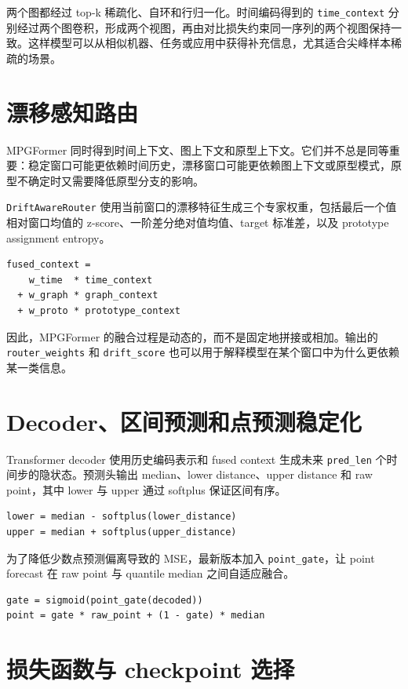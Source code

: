 \documentclass[UTF8,a4paper,11pt]{ctexart}
\begin{document}
两个图都经过 top-k 稀疏化、自环和行归一化。时间编码得到的 \verb|time_context| 分别经过两个图卷积，形成两个视图，再由对比损失约束同一序列的两个视图保持一致。这样模型可以从相似机器、任务或应用中获得补充信息，尤其适合尖峰样本稀疏的场景。

\section{漂移感知路由}

MPGFormer 同时得到时间上下文、图上下文和原型上下文。它们并不总是同等重要：稳定窗口可能更依赖时间历史，漂移窗口可能更依赖图上下文或原型模式，原型不确定时又需要降低原型分支的影响。

\verb|DriftAwareRouter| 使用当前窗口的漂移特征生成三个专家权重，包括最后一个值相对窗口均值的 z-score、一阶差分绝对值均值、target 标准差，以及 prototype assignment entropy。

\begin{lstlisting}
fused_context =
    w_time  * time_context
  + w_graph * graph_context
  + w_proto * prototype_context
\end{lstlisting}

因此，MPGFormer 的融合过程是动态的，而不是固定地拼接或相加。输出的 \verb|router_weights| 和 \verb|drift_score| 也可以用于解释模型在某个窗口中为什么更依赖某一类信息。

\section{Decoder、区间预测和点预测稳定化}

Transformer decoder 使用历史编码表示和 fused context 生成未来 \verb|pred_len| 个时间步的隐状态。预测头输出 median、lower distance、upper distance 和 raw point，其中 lower 与 upper 通过 softplus 保证区间有序。

\begin{lstlisting}
lower = median - softplus(lower_distance)
upper = median + softplus(upper_distance)
\end{lstlisting}

为了降低少数点预测偏离导致的 MSE，最新版本加入 \verb|point_gate|，让 point forecast 在 raw point 与 quantile median 之间自适应融合。

\begin{lstlisting}
gate = sigmoid(point_gate(decoded))
point = gate * raw_point + (1 - gate) * median
\end{lstlisting}

\section{损失函数与 checkpoint 选择}
\end{document}
